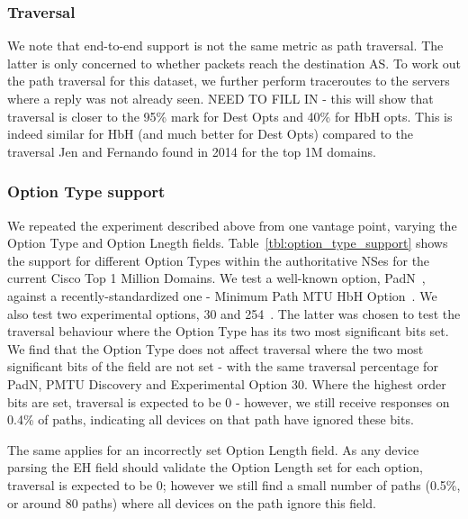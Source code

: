 \documentclass[conference]{IEEEtran}
\begin{document}
\subsubsection{Traversal}

We note that end-to-end support is not the same metric as path traversal. The latter is only concerned to whether packets reach the destination AS. To work out the path traversal for this dataset, we further perform traceroutes to the servers where a reply was not already seen.
NEED TO FILL IN - this will show that traversal is closer to the 95\% mark for Dest Opts and 40\% for HbH opts. This is indeed similar for HbH (and much better for Dest Opts) compared to the traversal Jen and Fernando found in 2014 for the top 1M domains.


\subsubsection{Option Type support}

We repeated the experiment described above from one vantage point, varying the Option Type and Option Lnegth fields. 
Table~\ref{tbl:option_type_support} shows the support for different Option Types within the authoritative NSes for the current Cisco Top 1 Million Domains. We test a well-known option, PadN~\cite{rfc2460}, against a recently-standardized one - Minimum Path MTU HbH Option~\cite{rfc9268}. We also test two experimental options, 30 and 254~\cite{RFC4727}. The latter was chosen to test the traversal behaviour where the Option Type has its two most significant bits set.
We find that the Option Type does not affect traversal where the two most significant bits of the field are not set - with the same traversal percentage for PadN, PMTU Discovery and Experimental Option 30. Where the highest order bits are set, traversal is expected to be 0 - however, we still receive responses on 0.4\% of paths, indicating all devices on that path have ignored these bits.

The same applies for an incorrectly set Option Length field. As any device parsing the EH field should validate the Option Length set for each option, traversal is expected to be 0; however we still find a small number of paths (0.5\%, or around 80 paths) where all devices on the path ignore this field.
\end{document}
